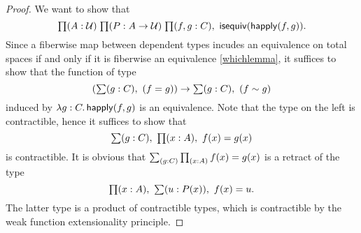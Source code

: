 \begin{proof}
We want to show that
\begin{equation*}
\prd{A:\type}{P:A\to\type}{f,g:C}\isequiv(\happly (f,g)).
\end{equation*}
Since a fiberwise map between dependent types incudes an equivalence on total spaces
if and only if it is fiberwise an equivalence \autoref{whichlemma}, it suffices to show that the function of type
\begin{equation*}
(\sm{g:C}(f= g)) \to \sm{g:C}(f\htpy g)
\end{equation*}
induced by $\lam{g : C} \happly (f,g)$ is an equivalence. Note that the type on the left is contractible, hence it suffices to show that
\begin{equation*}
\sm{g:C}\prd{x:A}f(x)= g(x)
\end{equation*}
is contractible. It is obvious that $\sm{g:C}\prd{x:A}f(x)= g(x)$ is a retract of the type
\begin{equation*}
\prd{x:A}\sm{u:P(x)}f(x)= u.
\end{equation*}
The latter type is a product of contractible types, which is contractible by the weak function extensionality principle.
\end{proof}



